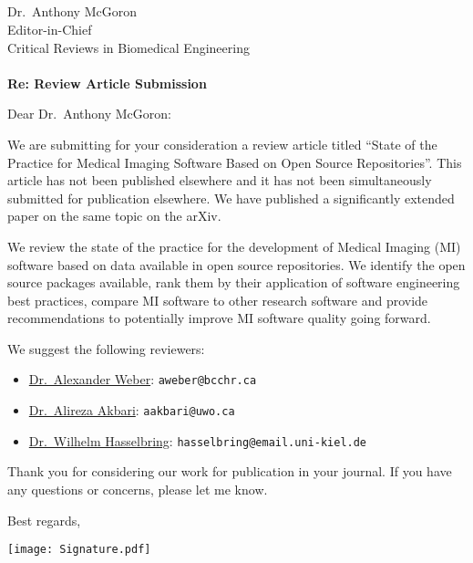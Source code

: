 \documentclass[12pt]{casletter}
\begin{document}
\begin{letter}{~\\
~\\
~\\
~\\
Dr.\ Anthony McGoron\\
Editor-in-Chief\\
Critical Reviews in Biomedical Engineering\\
~\\
{\bf Re: Review Article Submission}}

\opening {Dear Dr.\ Anthony McGoron:}

We are submitting for your consideration a review article titled ``State of the
Practice for Medical Imaging Software Based on Open Source Repositories''.  This
article has not been published elsewhere and it has not been simultaneously
submitted for publication elsewhere. We have published a significantly extended
paper on the same topic on the arXiv.

We review the state of the practice for the development of Medical Imaging (MI)
software based on data available in open source repositories. We identify the
open source packages available, rank them by their application of software
engineering best practices, compare MI software to other research software and
provide recommendations to potentially improve MI software quality going
forward.

We suggest the following reviewers:

\begin{itemize}
    \item \href{https://bme.ubc.ca/?directory=alexander-weber} {Dr.\ Alexander Weber}: \texttt{aweber@bcchr.ca}
    \item \href{https://www.robarts.ca/scholl_group/people/bio/akbari_alireza.html} {Dr.\ Alireza Akbari}: \texttt{aakbari@uwo.ca}
    \item \href{https://www.se.informatik.uni-kiel.de/en/team/prof.-dr.-wilhelm-willi-hasselbring} {Dr.\ Wilhelm Hasselbring}: \texttt{hasselbring@email.uni-kiel.de}
\end{itemize}

Thank you for considering our work for publication in your journal.  If you have
any questions or concerns, please let me know.

\closing{Best regards,~\newline}
\vspace{-29mm}
\texttt{[image: Signature.pdf]}

\end {letter}
\end{document}
